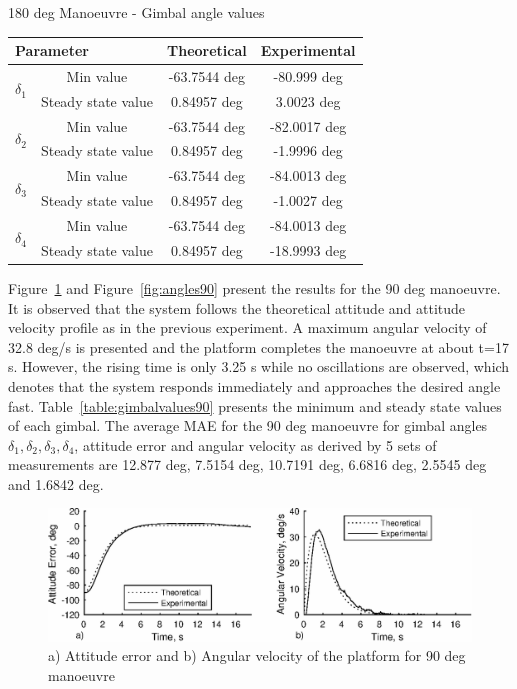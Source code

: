 \documentclass[aerospace,article,submit,moreauthors,dvi2pdf]{Definitions/mdpi}
\begin{document}
\begin{specialtable}[H] 
\caption{\label{table:gimbalvalues} 180 deg Manoeuvre - Gimbal angle values}
\begin{tabular}{lc|cc}
\toprule
\multicolumn{2}{l}{\textbf{Parameter} } & \textbf{Theoretical} & \textbf{Experimental}   \\
\midrule
\multirow{2}{*}{$\delta_1$} & Min value                     &-63.7544 deg &  -80.999 deg   \\
                                    & Steady state value       &0.84957 deg & 3.0023 deg      \\
\multirow{2}{*}{$\delta_2$} & Min value                     &-63.7544 deg & -82.0017 deg       \\
                                    & Steady state value      &0.84957 deg  & -1.9996  deg     \\
\multirow{2}{*}{$\delta_3$} & Min value                    &-63.7544 deg  & -84.0013 deg    \\
                                    & Steady state value      &0.84957 deg  & -1.0027  deg     \\
\multirow{2}{*}{$\delta_4$} & Min value                    &-63.7544 deg  & -84.0013 deg        \\
                                    & Steady state value      &0.84957 deg  & -18.9993 deg     \\
\bottomrule
\end{tabular}
\end{specialtable}

Figure~\ref{fig:attitude90} and Figure~\ref{fig:angles90} present the results for the 90 deg manoeuvre. It is observed that the system follows the theoretical attitude and attitude velocity profile as in the previous experiment. A maximum angular velocity of 32.8 deg/s is presented and the platform completes the manoeuvre at about t=17 s. However, the rising time is only 3.25 s while no oscillations are observed, which denotes that the system responds immediately and approaches the desired angle fast. Table~\ref{table:gimbalvalues90} presents the minimum and steady state values of each gimbal. The average MAE for the 90 deg manoeuvre for gimbal angles $\delta_1, \delta_2, \delta_3, \delta_4  $, attitude error and angular velocity as derived by 5 sets of measurements are 12.877 deg, 7.5154 deg, 10.7191 deg,  6.6816 deg, 2.5545 deg and 1.6842 deg.
 

\begin{figure}[H]
\includegraphics[width=13cm]{attitude90.eps}
\caption{a) Attitude error and b) Angular velocity of the platform for 90 deg manoeuvre \label{fig:attitude90}}
\end{figure}
\end{document}
